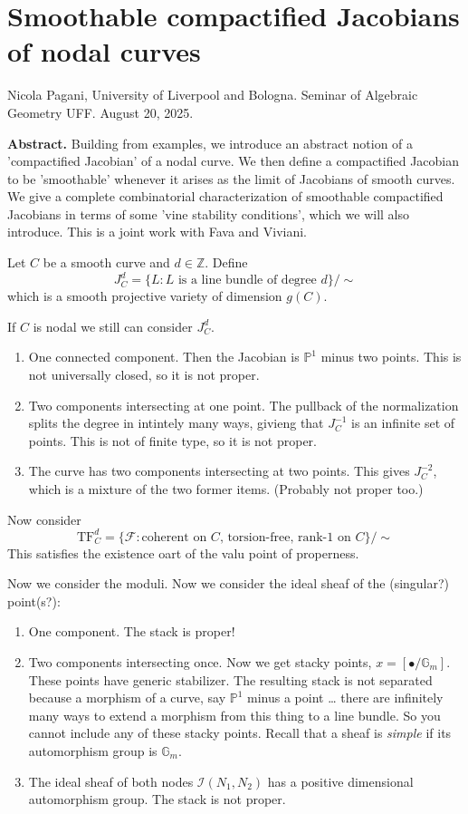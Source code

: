 \section{Smoothable compactified Jacobians of nodal curves}
\label{section-smoothable-compactified-Jacobians-of-nodal-curves}

\noindent
Nicola Pagani, University of Liverpool and Bologna. 
Seminar of Algebraic Geometry UFF. 
August 20, 2025.

\medskip
{\bf Abstract.} Building from examples, we introduce an abstract notion of a
'compactified Jacobian' of a nodal curve. We then define a compactified Jacobian
to be 'smoothable' whenever it arises as the limit of Jacobians of smooth
curves. We give a complete combinatorial characterization of smoothable
compactified Jacobians in terms of some 'vine stability conditions', which we
will also introduce. This is a joint work with Fava and Viviani.

\medskip\noindent



Let $C$ be a smooth curve and $d \in \mathbb{Z}$. Define
$$
J^d_C=\{L:\text{$L$ is a line bundle of degree $d$}\}/\sim
$$
which is a smooth projective variety of dimension $g(C)$.

If $C$ is nodal we still can consider $J^d_C$.
\begin{enumerate}
\item One connected component. Then the Jacobian is $\mathbb{P}^1$ minus two
points. This is not universally closed, so it is not proper.
\item Two components intersecting at one point. 
The pullback of the normalization splits the degree in
intintely many ways, givieng that $J^{-1}_C$ is an infinite set of points. This
is not of finite type, so it is not proper.
\item The curve has two components intersecting at two points. 
This gives $J^{-2}_C$,
 which is a mixture of the two former items. (Probably not proper too.)
\end{enumerate}

\medskip\noindent
Now consider
$$
\text{TF}_C^d=\{\mathcal{F}:
\text{coherent on $C$, torsion-free, rank-1 on $C$}\}/\sim
$$
This satisfies the existence oart of the valu point of properness.

Now we consider the moduli. Now we consider the ideal sheaf of the (singular?)
point(s?):
\begin{enumerate}
\item One component. The stack is proper!
\item Two components intersecting once. Now we get stacky points, 
$x=[\bullet/\mathbb{G}_m]$. These points have generic stabilizer. The resulting
stack is not separated because a morphism of a curve, say $\mathbb{P}^1$ minus a
point … there are infinitely many ways to extend a morphism from this thing to a
line bundle. So you cannot include any of these stacky points. Recall that a
sheaf is {\it simple} if its automorphism group is $\mathbb{G}_m$.
\item  The ideal sheaf of both nodes 
$\mathcal{I}(N_1,N_2)$ has a positive dimensional automorphism
group. The stack is not proper.
\end{enumerate}

